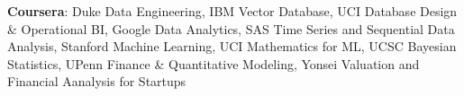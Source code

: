\textbf{Coursera}: Duke Data Engineering, IBM Vector Database, UCI Database Design \& Operational BI, Google Data Analytics, SAS Time Series and Sequential Data Analysis, Stanford Machine Learning, UCI Mathematics for ML, UCSC Bayesian Statistics, UPenn Finance \& Quantitative Modeling, Yonsei Valuation and Financial Aanalysis for Startups